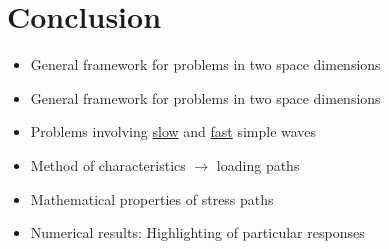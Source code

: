 \documentclass[11pt,aspectratio=169]{beamer}
\begin{document}
\section*{Conclusion}
\begin{frame}[standout]{}
  \begin{scriptsize}
    \begin{overprint}
      \vspace{-0.3cm}
      \begin{block}{\footnotesize {}}
        \vskip -6pt \begin{itemize}
        \item General framework for problems in two space dimensions
        \end{itemize}
      \end{block}
      \vspace{-0.3cm}
      \begin{block}{\footnotesize {}}
        \vskip -6pt \begin{itemize}
        \item General framework for problems in two space dimensions
        \end{itemize}
      \end{block}
      \vspace{-0.3cm}
      \begin{block}{\footnotesize {}}
        \vskip -6pt \begin{itemize}
        \item Problems involving \underline{slow} and \underline{fast} simple waves
        \item Method of characteristics $\rightarrow$ loading paths
        \item Mathematical properties of stress paths
        \item Numerical results: Highlighting of particular responses
        \end{itemize}
      \end{block}
      \vspace{-0.3cm}
      \begin{block}{\footnotesize {}}

\end{block}
\end{overprint}
\end{scriptsize}
\end{frame}
\end{document}
